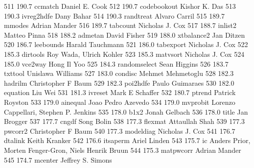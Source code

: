    511    190.7    ccmatch       Daniel E. Cook                          
   512    190.7    codebookout   Kishor K. Das                           
   513    190.3    ivreg2hdfe    Dany Bahar                              
   514    190.3    randtreat     Alvaro Carril                           
   515    189.7    mmodes        Adrian Mander                           
   516    189.7    tabcount      Nicholas J. Cox                         
   517    188.7    inlist2       Matteo Pinna                            
   518    188.2    admetan       David Fisher                            
   519    188.0    xtbalance2    Jan Ditzen                              
   520    186.7    leebounds     Harald Tauchmann                        
   521    186.0    tabexport     Nicholas J. Cox                         
   522    185.3    dirtools      Roy Wada, Ulrich Kohler                 
   523    185.3    matvsort      Nicholas J. Cox                         
   524    185.0    vce2way       Hong Il Yoo                             
   525    184.3    randomselect  Sean Higgins                            
   526    183.7    txttool       Unislawa Williams                       
   527    183.0    condisc       Mehmet Mehmetoglu                       
   528    182.3    hadrilm       Christopher F Baum                      
   529    182.3    poi2hdfe      Paulo Guimaraes                         
   530    182.0    equation      Liu Wei                                 
   531    181.3    ivreset       Mark E Schaffer                         
   532    180.7    ptrend        Patrick Royston                         
   533    179.0    ainequal      Joao Pedro Azevedo                      
   534    179.0    mvprobit      Lorenzo Cappellari, Stephen P. Jenkins  
   535    178.0    b1x2          Jonah Gelbach                           
   536    178.0    title         Jan Brogger                             
   537    177.7    cngdf         Song Bolin                              
   538    177.3    flexmat       Attaullah Shah                          
   539    177.3    pwcorr2       Christopher F Baum                      
   540    177.3    modeldiag     Nicholas J. Cox                         
   541    176.7    dtalink       Keith Kranker                           
   542    176.6    itsaperm      Ariel Linden                            
   543    175.7    ic            Anders Prior, Morten Fenger-Gron, Niels 
                                   Henrik Bruun                            
   544    175.3    matpwcorr     Adrian Mander                           
   545    174.7    mcenter       Jeffrey S. Simons                       
